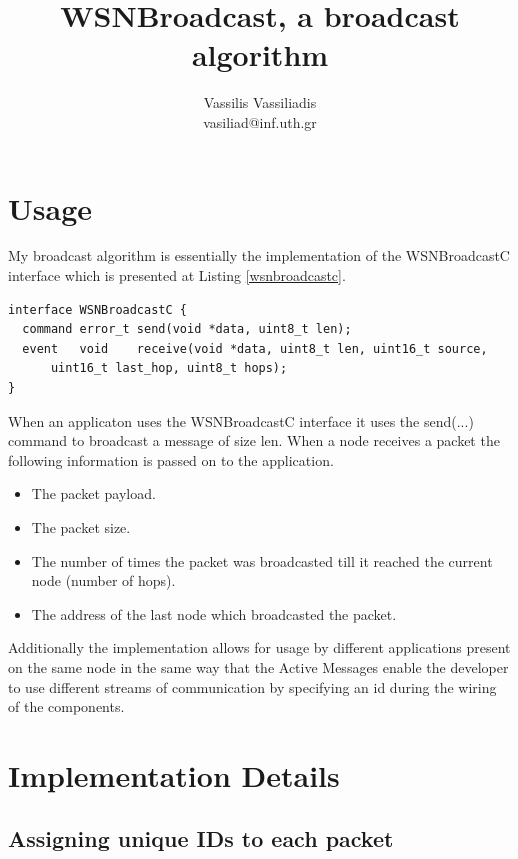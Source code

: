 \documentclass[a4paper]{article}
\begin{document}
\title{WSNBroadcast, a broadcast algorithm}
\author{Vassilis Vassiliadis\\vasiliad@inf.uth.gr}
\maketitle

\section{Usage}

My broadcast algorithm is essentially the implementation of the WSNBroadcastC interface which is presented at Listing \ref{wsnbroadcastc}.

\begin{lstlisting}[float=h, caption=WSNBroadcastC.nc Interface., label=wsnbroadcastc]
interface WSNBroadcastC {
  command error_t send(void *data, uint8_t len);
  event   void    receive(void *data, uint8_t len, uint16_t source,
      uint16_t last_hop, uint8_t hops);
}
\end{lstlisting}

When an applicaton uses the WSNBroadcastC interface it uses the send(...) command
to broadcast a message of size len. When a node receives a packet the following information
is passed on to the application.

\begin{itemize}
\item The packet payload.
\item The packet size.
\item The number of times the packet was broadcasted till it reached the current node (number of hops).
\item The address of the last node which broadcasted the packet.
\end{itemize}

Additionally the implementation allows for usage by different applications present on the same node in the same way
that the Active Messages enable the developer to use different streams of communication by specifying an id
during the wiring of the components.


\section{Implementation Details}
\subsection*{Assigning unique IDs to each packet}
\end{document}
